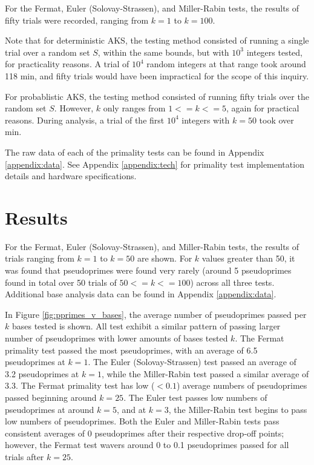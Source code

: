 \documentclass{article}
\begin{document}
For the Fermat, Euler (Solovay-Strassen), and Miller-Rabin tests, the results of fifty trials were recorded, ranging from $k = 1$ to $k = 100$.

Note that for deterministic AKS, the testing method consisted of running a single trial over a random set $S$, within the same bounds, but with $10^3$ integers tested, for practicality reasons. A trial of $10^4$ random integers at that range took around 118 min, and fifty trials would have been impractical for the scope of this inquiry.

For probablistic AKS, the testing method consisted of running fifty trials over the random set $S$. However, $k$ only ranges from $1 <= k <= 5$, again for practical reasons. During analysis, a trial of the first $10^4$ integers with $k = 50$ took over min.

The raw data of each of the primality tests can be found in Appendix \ref{appendix:data}.
See Appendix \ref{appendix:tech} for primality test implementation details and hardware specifications.

\section{Results}
For the Fermat, Euler (Solovay-Strassen), and Miller-Rabin tests, the results of trials ranging from $k = 1$ to $k = 50$ are shown. For $k$ values greater than 50, it was found that pseudoprimes were found very rarely (around 5 pseudoprimes found in total over 50 trials of $50 <= k <= 100$) across all three tests. Additional base analysis data can be found in Appendix \ref{appendix:data}.

In Figure \ref{fig:pprimes_v_bases}, the average number of pseudoprimes passed per $k$ bases tested is shown. All test exhibit a similar pattern of passing larger number of pseudoprimes with lower amounts of bases tested $k$. The Fermat primality test passed the most pseudoprimes, with an average of 6.5 pseudoprimes at $k = 1$. The Euler (Solovay-Strassen) test passed an average of 3.2 pseudoprimes at $k = 1$, while the Miller-Rabin test passed a similar average of 3.3. The Fermat primality test has low ($<0.1$) average numbers of pseudoprimes passed beginning around $k = 25$. The Euler test passes low numbers of pseudoprimes at around $k = 5$, and at $k = 3$, the Miller-Rabin test begins to pass low numbers of pseudoprimes. Both the Euler and Miller-Rabin tests pass consistent averages of 0 pseudoprimes after their respective drop-off points; however, the Fermat test wavers around 0 to 0.1 pseudoprimes passed for all trials after $k = 25$.
\end{document}

